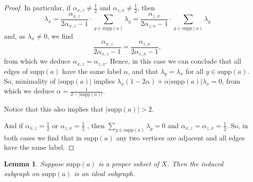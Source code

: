 \documentclass[oneside,a4paper]{amsart} %
\newtheorem{lemma}[proposition]{Lemma}
\theoremstyle{definition}
\begin{document}
\begin{proof}
In particular, if $\alpha_{x,z}\neq \frac{1}{2}$ and $\alpha_{z,x}\neq \frac{1}{2}$, then 
$$\lambda_x=\frac{\alpha_{x,z}}{2\alpha_{x,z}-1}\cdot\displaystyle\sum_{y\in \mathrm{supp}(a)} \lambda_y=\frac{\alpha_{z,x}}{2\alpha_{z,x}-1}\cdot\displaystyle\sum_{y\in \mathrm{supp}(a)} \lambda_y$$
and, as $\lambda_x\neq 0$, we find $$\frac{\alpha_{x,z}}{2\alpha_{x,z}-1}=\frac{\alpha_{z,x}}{2\alpha_{z,x}-1},$$
from which we deduce $\alpha_{x,z}=\alpha_{z,x}$.
Hence, in this case we can conclude that all edges of $\mathrm{supp}(a)$ have the same label 
$\alpha$,  
and that $\lambda_y=\lambda_x$ for all $y\in \mathrm{supp}(a)$. 
So, minimality of $|\mathrm{supp}(a)|$ implies $\lambda_x(1-2\alpha)+\alpha|\mathrm{supp}(a)|\lambda_x=0$, from which we deduce $\alpha=\frac{1}{2-|\mathrm{supp}(a)|}$. 

Notice that this also implies that  $|\mathrm{supp}(a)|>2$.



And if $\alpha_{x,z}=\frac{1}{2}$ or $\alpha_{z,x}=\frac{1}{2}$ , then $\displaystyle\sum_{y\in \mathrm{supp}(a)}\lambda_y=0$ and $\alpha_{x,z}=\alpha_{z,x}=\frac{1}{2}$.
So, in both cases we find that in $\mathrm{supp}(a)$ any two vertices are adjacent and all edges have the same label.
\end{proof}




\begin{lemma}\label{proper}
Suppose $\mathrm{supp}(a)$ is a proper subset of $X$.
Then the induced subgraph on $\mathrm{supp}(a)$ is an ideal subgraph.
\end{lemma}
\end{document}
